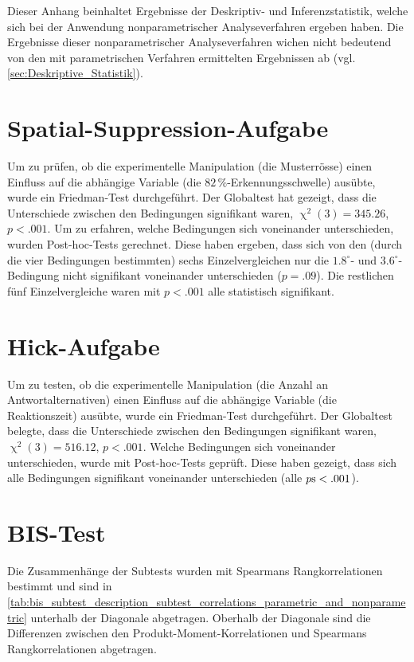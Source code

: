 \documentclass[11pt, twoside, a4paper]{book}		%
\begin{document}
Dieser Anhang beinhaltet Ergebnisse der Deskriptiv- und Inferenzstatistik, welche sich bei der Anwendung nonparametrischer Analyseverfahren ergeben haben. Die Ergebnisse dieser nonparametrischer Analyseverfahren wichen nicht bedeutend von den mit parametrischen Verfahren ermittelten Ergebnissen ab (vgl. \autoref{sec:Deskriptive_Statistik}).

\section{Spatial-Suppression-Aufgabe}

Um zu prüfen, ob die experimentelle Manipulation (die Musterrösse) einen Einfluss auf die abhängige Variable (die $82\,\%$-Er\-ken\-nungs\-schwel\-le) ausübte, wurde ein Friedman-Test durchgeführt. Der Globaltest hat gezeigt, dass die Unterschiede zwischen den Bedingungen signifikant waren, $\upchi^2(3)=345.26$, $p<.001$. 
Um zu erfahren, welche Bedingungen sich voneinander unterschieden, wurden Post-hoc-Tests \citep{Galili2010, Hollander2014} gerechnet. Diese haben ergeben, dass sich von den (durch die vier Bedingungen bestimmten) sechs Einzelvergleichen nur die $1.8^{\circ}$- und $3.6^{\circ}$-Bedingung nicht signifikant voneinander unterschieden ($p=.09$). Die restlichen fünf Einzelvergleiche waren mit $p<.001$ alle statistisch signifikant.

\section{Hick-Aufgabe}

Um zu testen, ob die experimentelle Manipulation (die Anzahl an Antwortalternativen) einen Einfluss auf die abhängige Variable (die Reaktionszeit) ausübte, wurde ein Friedman-Test durchgeführt. Der Globaltest belegte, dass die Unterschiede zwischen den Bedingungen signifikant waren, $\upchi^2(3)=516.12$, $p<.001$. Welche Bedingungen sich voneinander unterschieden, wurde mit Post-hoc-Tests \citep{Galili2010, Hollander2014} geprüft. Diese haben gezeigt, dass sich alle Bedingungen signifikant voneinander unterschieden (alle $p\textnormal{s}<.001$). 

\section{BIS-Test}

Die Zusammenhänge der Subtests wurden mit Spearmans Rangkorrelationen bestimmt und sind in \autoref{tab:bis_subtest_description_subtest_correlations_parametric_and_nonparametric} unterhalb der Diagonale abgetragen. Oberhalb der Diagonale sind die Differenzen zwischen den Produkt-Moment-Korrelationen und Spearmans Rangkorrelationen abgetragen.
\end{document}
